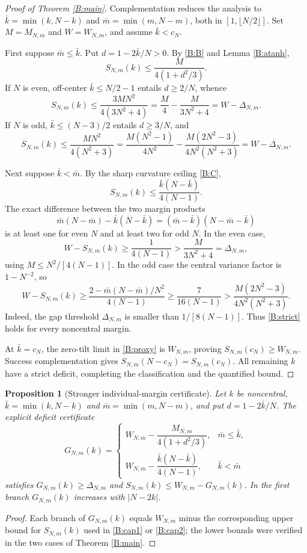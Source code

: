 \documentclass[11pt,a4paper]{article}
\newtheorem{proposition}[theorem]{Proposition}
\begin{document}
\begin{proof}[Proof of Theorem \ref{B:main}]
Complementation reduces the analysis to
$\bar k=\min(k,N-k)$ and $\bar m=\min(m,N-m)$, both in
$[1,\lfloor N/2\rfloor]$. Set $M=M_{N,m}$ and $W=W_{N,m}$,
and assume $\bar k<c_N$.

First suppose $\bar m\le\bar k$. Put $d=1-2\bar k/N>0$.
By \eqref{B:B} and Lemma \ref{B:atanh},
\begin{equation}\label{B:cap1}
S_{N,m}(k)\le\frac{M}{4(1+d^2/3)}.
\end{equation}
If $N$ is even, off-center $\bar k\le N/2-1$ entails
$d\ge 2/N$, whence
\[
S_{N,m}(k)\le
\frac{3MN^2}{4(3N^2+4)}
=\frac{M}{4}-\frac{M}{3N^2+4}=W-\Delta_{N,m}.
\]
If $N$ is odd, $\bar k\le(N-3)/2$ entails $d\ge3/N$,
and
\[
S_{N,m}(k)\le\frac{MN^2}{4(N^2+3)}
=\frac{M(N^2-1)}{4N^2}
-\frac{M(2N^2-3)}{4N^2(N^2+3)}
=W-\Delta_{N,m}.
\]

Next suppose $\bar k<\bar m$. By the sharp curvature
ceiling \eqref{B:C},
\begin{equation}\label{B:cap2}
S_{N,m}(k)\le
\frac{\bar k(N-\bar k)}{4(N-1)}.
\end{equation}
The exact difference between the two margin products
\begin{equation}\label{B:disc}
\bar m(N-\bar m)-\bar k(N-\bar k)
=(\bar m-\bar k)(N-\bar m-\bar k)
\end{equation}
is at least one for even $N$ and at least two for odd $N$.
In the even case,
\[
W-S_{N,m}(k)\ge\frac{1}{4(N-1)}
>\frac{M}{3N^2+4}=\Delta_{N,m},
\]
using $M\le N^2/[4(N-1)]$.
In the odd case the central variance factor is $1-N^{-2}$, so
\[
W-S_{N,m}(k)\ge
\frac{2-\bar m(N-\bar m)/N^2}{4(N-1)}
\ge\frac{7}{16(N-1)}
>\frac{M(2N^2-3)}{4N^2(N^2+3)}.
\]
Indeed, the gap threshold $\Delta_{N,m}$ is smaller than $1/[8(N-1)]$.
Thus \eqref{B:strict} holds for every noncentral margin.

At $\bar k=c_N$, the zero-tilt limit in \eqref{B:proxy} is
$W_{N,m}$, proving $S_{N,m}(c_N)\ge W_{N,m}$.
Success complementation gives
$S_{N,m}(N-c_N)=S_{N,m}(c_N)$.
All remaining $k$ have a strict deficit, completing the
classification and the quantified bound.
\end{proof}

\begin{proposition}[Stronger individual-margin certificate]\label{B:individual}
Let $k$ be noncentral, $\bar k=\min(k,N-k)$ and
$\bar m=\min(m,N-m)$, and put $d=1-2\bar k/N$.
The explicit deficit certificate
\[
G_{N,m}(k)=
\begin{cases}
W_{N,m}-\dfrac{M_{N,m}}{4(1+d^2/3)},&\bar m\le\bar k,\\[8pt]
W_{N,m}-\dfrac{\bar k(N-\bar k)}{4(N-1)},&\bar k<\bar m
\end{cases}
\]
satisfies $G_{N,m}(k)\ge\Delta_{N,m}$ and
$S_{N,m}(k)\le W_{N,m}-G_{N,m}(k)$.
In the first branch $G_{N,m}(k)$ increases with
$|N-2k|$.
\end{proposition}
\begin{proof}
Each branch of $G_{N,m}(k)$ equals $W_{N,m}$ minus the corresponding upper bound for $S_{N,m}(k)$ used in
\eqref{B:cap1} or \eqref{B:cap2}; the lower bounds were
verified in the two cases of Theorem \ref{B:main}.
\end{proof}
\end{document}
